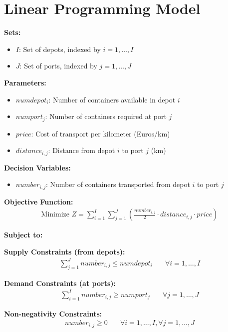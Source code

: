 \documentclass{article}
\begin{document}
\section*{Linear Programming Model}

\textbf{Sets:}
\begin{itemize}
    \item $I$: Set of depots, indexed by $i = 1, \ldots, I$
    \item $J$: Set of ports, indexed by $j = 1, \ldots, J$
\end{itemize}

\textbf{Parameters:}
\begin{itemize}
    \item $numdepot_i$: Number of containers available in depot $i$
    \item $numport_j$: Number of containers required at port $j$
    \item $price$: Cost of transport per kilometer (Euros/km)
    \item $distance_{i,j}$: Distance from depot $i$ to port $j$ (km)
\end{itemize}

\textbf{Decision Variables:}
\begin{itemize}
    \item $number_{i,j}$: Number of containers transported from depot $i$ to port $j$
\end{itemize}

\textbf{Objective Function:}
\begin{align*}
    \text{Minimize } Z = \sum_{i=1}^{I} \sum_{j=1}^{J} \left(\frac{number_{i,j}}{2} \cdot distance_{i,j} \cdot price\right)
\end{align*}

\textbf{Subject to:}

\textbf{Supply Constraints (from depots):}
\begin{align*}
    \sum_{j=1}^{J} number_{i,j} \leq numdepot_i \quad & \forall i = 1, \ldots, I
\end{align*}

\textbf{Demand Constraints (at ports):}
\begin{align*}
    \sum_{i=1}^{I} number_{i,j} \geq numport_j \quad & \forall j = 1, \ldots, J
\end{align*}

\textbf{Non-negativity Constraints:}
\begin{align*}
    number_{i,j} \geq 0 \quad & \forall i = 1, \ldots, I, \forall j = 1, \ldots, J
\end{align*}
\end{document}
